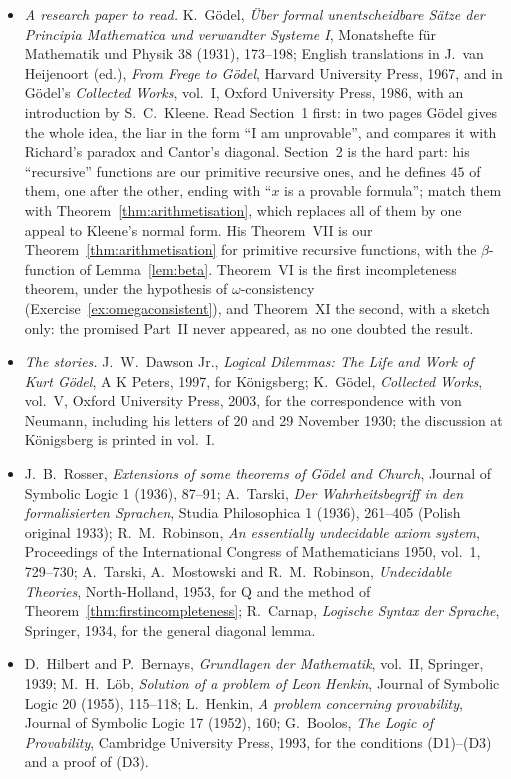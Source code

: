 \begin{itemize}
\item \emph{A research paper to read.} K.~Gödel, \emph{Über formal unentscheidbare Sätze der Principia Mathematica und verwandter Systeme I}, Monatshefte für Mathematik und Physik 38 (1931), 173--198; English translations in J.~van Heijenoort (ed.), \emph{From Frege to Gödel}, Harvard University Press, 1967, and in Gödel's \emph{Collected Works}, vol.~I, Oxford University Press, 1986, with an introduction by S.~C.~Kleene. Read Section~1 first: in two pages Gödel gives the whole idea, the liar in the form ``I am unprovable'', and compares it with Richard's paradox and Cantor's diagonal. Section~2 is the hard part: his ``recursive'' functions are our primitive recursive ones, and he defines $45$ of them, one after the other, ending with ``$x$ is a provable formula''; match them with Theorem~\ref{thm:arithmetisation}, which replaces all of them by one appeal to Kleene's normal form. His Theorem~VII is our Theorem~\ref{thm:arithmetisation} for primitive recursive functions, with the $\beta$-function of Lemma~\ref{lem:beta}. Theorem~VI is the first incompleteness theorem, under the hypothesis of $\omega$-consistency (Exercise~\ref{ex:omegaconsistent}), and Theorem~XI the second, with a sketch only: the promised Part~II never appeared, as no one doubted the result.
\item \emph{The stories.} J.~W.~Dawson Jr., \emph{Logical Dilemmas: The Life and Work of Kurt Gödel}, A K Peters, 1997, for Königsberg; K.~Gödel, \emph{Collected Works}, vol.~V, Oxford University Press, 2003, for the correspondence with von Neumann, including his letters of 20 and 29 November 1930; the discussion at Königsberg is printed in vol.~I.
\item J.~B.~Rosser, \emph{Extensions of some theorems of Gödel and Church}, Journal of Symbolic Logic 1 (1936), 87--91; A.~Tarski, \emph{Der Wahrheitsbegriff in den formalisierten Sprachen}, Studia Philosophica 1 (1936), 261--405 (Polish original 1933); R.~M.~Robinson, \emph{An essentially undecidable axiom system}, Proceedings of the International Congress of Mathematicians 1950, vol.~1, 729--730; A.~Tarski, A.~Mostowski and R.~M.~Robinson, \emph{Undecidable Theories}, North-Holland, 1953, for $\mathrm Q$ and the method of Theorem~\ref{thm:firstincompleteness}; R.~Carnap, \emph{Logische Syntax der Sprache}, Springer, 1934, for the general diagonal lemma.
\item D.~Hilbert and P.~Bernays, \emph{Grundlagen der Mathematik}, vol.~II, Springer, 1939; M.~H.~Löb, \emph{Solution of a problem of Leon Henkin}, Journal of Symbolic Logic 20 (1955), 115--118; L.~Henkin, \emph{A problem concerning provability}, Journal of Symbolic Logic 17 (1952), 160; G.~Boolos, \emph{The Logic of Provability}, Cambridge University Press, 1993, for the conditions (D1)--(D3) and a proof of (D3).

\end{itemize}
